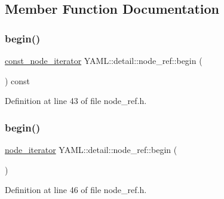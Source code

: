 \subsection{Member Function Documentation}
\mbox{\label{class_y_a_m_l_1_1detail_1_1node__ref_a36c081e7a440b8dbbd532da0cfdc426d}} 
\subsubsection{\texorpdfstring{begin()}{begin()}\hspace{0.1cm}{\footnotesize\ttfamily [1/2]}}
{\footnotesize\ttfamily \mbox{\hyperlink{namespace_y_a_m_l_1_1detail_a049af8e269401cbe1e735033914e4356}{const\+\_\+node\+\_\+iterator}} Y\+A\+M\+L\+::detail\+::node\+\_\+ref\+::begin (\begin{DoxyParamCaption}{ }\end{DoxyParamCaption}) const\hspace{0.3cm}{\ttfamily [inline]}}



Definition at line 43 of file node\+\_\+ref.\+h.

\mbox{\label{class_y_a_m_l_1_1detail_1_1node__ref_a2bd904440f55614473fa2c2591669453}} 
\subsubsection{\texorpdfstring{begin()}{begin()}\hspace{0.1cm}{\footnotesize\ttfamily [2/2]}}
{\footnotesize\ttfamily \mbox{\hyperlink{namespace_y_a_m_l_1_1detail_aa2a961156810d41a3b6744c10186afac}{node\+\_\+iterator}} Y\+A\+M\+L\+::detail\+::node\+\_\+ref\+::begin (\begin{DoxyParamCaption}{ }\end{DoxyParamCaption})\hspace{0.3cm}{\ttfamily [inline]}}



Definition at line 46 of file node\+\_\+ref.\+h.

\mbox{\label{class_y_a_m_l_1_1detail_1_1node__ref_a9e9b30c734ef04339eace18f7791ca4f}} 

